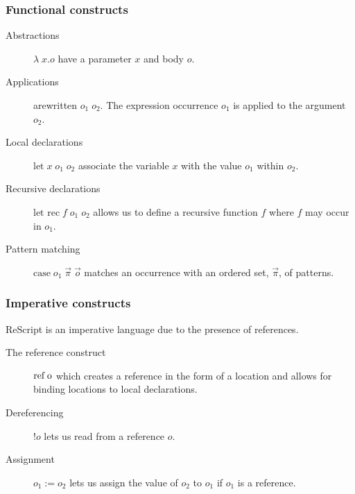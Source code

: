 \documentclass{beamer}
\begin{document}

\begin{frame}
  \frametitle{Functional constructs}

 \begin{description}
  \item[Abstractions] $\lambda\;x.o$ have a parameter $x$ and
body $o$.  

\item[Applications] arewritten $o_1\;o_2$. The expression occurrence
  $o_1$ is applied to the argument $o_2$.

\item[Local declarations] $\mbox{let} \; x \; o_1 \; o_2$ associate
the variable $x$ with the value $o_1$ within $o_2$.

\item[Recursive declarations]
$\mbox{let rec} \; f \; o_1 \; o_2$ allows us to define a recursive
function $f$ where $f$ may occur in $o_1$.

\item[Pattern matching] $\mbox{case} \; o_1 \; \vec{\pi} \; \vec{o}$
  matches an occurrence with an ordered set, $\vec{\pi}$, of
  patterns. 
\end{description}

\end{frame}

\begin{frame}
  \frametitle{Imperative constructs}
  
  ReScript is an imperative language due to the presence of
  references.

  \begin{description}
    \item[The reference construct] $\mbox{ref\;o}$ which creates a reference in the form of a location and allows for binding locations to local declarations.

    \item[Dereferencing] $!o$ lets us read from a reference $o$.

    \item[Assignment] $o_1 := o_2$ lets us assign the value of $o_2$
      to $o_1$ if $o_1$ is a reference.
\end{description}


\end{frame}
\end{document}
